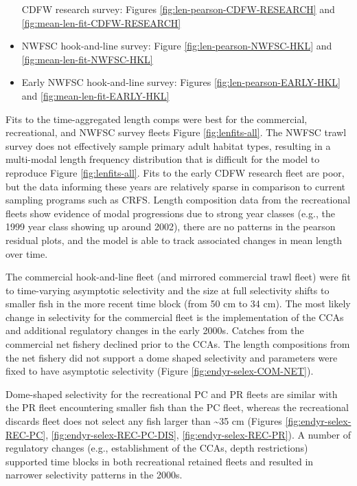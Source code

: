 \documentclass[11pt,
  english,
  a4paper,
]{article}
\begin{document}
\begin{itemize}
  CDFW research survey: Figures \ref{fig:len-pearson-CDFW-RESEARCH} and \ref{fig:mean-len-fit-CDFW-RESEARCH}

  \tagmcend\tagstructend\tagstructend
\item

  NWFSC hook-and-line survey: Figure \ref{fig:len-pearson-NWFSC-HKL} and \ref{fig:mean-len-fit-NWFSC-HKL}

  \tagmcend\tagstructend\tagstructend
\item

  Early NWFSC hook-and-line survey: Figures \ref{fig:len-pearson-EARLY-HKL} and \ref{fig:mean-len-fit-EARLY-HKL}

  \tagmcend\tagstructend\tagstructend
\end{itemize}

\tagstructend

Fits to the time-aggregated length comps were best for the commercial, recreational, and NWFSC survey fleets Figure \ref{fig:lenfits-all}. The NWFSC trawl survey does not effectively sample primary adult habitat types, resulting in a multi-modal length frequency distribution that is difficult for the model to reproduce Figure \ref{fig:lenfits-all}. Fits to the early CDFW research fleet are poor, but the data informing these years are relatively sparse in comparison to current sampling programs such as CRFS. Length composition data from the recreational fleets show evidence of modal progressions due to strong year classes (e.g., the 1999 year class showing up around 2002), there are no patterns in the pearson residual plots, and the model is able to track associated changes in mean length over time.

The commercial hook-and-line fleet (and mirrored commercial trawl fleet) were fit to time-varying asymptotic selectivity and the size at full selectivity shifts to smaller fish in the more recent time block (from 50 cm to 34 cm). The most likely change in selectivity for the commercial fleet is the implementation of the CCAs and additional regulatory changes in the early 2000s. Catches from the commercial net fishery declined prior to the CCAs. The length compositions from the net fishery did not support a dome shaped selectivity and parameters were fixed to have asymptotic selectivity (Figure \ref{fig:endyr-selex-COM-NET}).

Dome-shaped selectivity for the recreational PC and PR fleets are similar with the PR fleet encountering smaller fish than the PC fleet, whereas the recreational discards fleet does not select any fish larger than \textasciitilde35 cm (Figures \ref{fig:endyr-selex-REC-PC}, \ref{fig:endyr-selex-REC-PC-DIS}, \ref{fig:endyr-selex-REC-PR}). A number of regulatory changes (e.g., establishment of the CCAs, depth restrictions) supported time blocks in both recreational retained fleets and resulted in narrower selectivity patterns in the 2000s.
\end{document}
